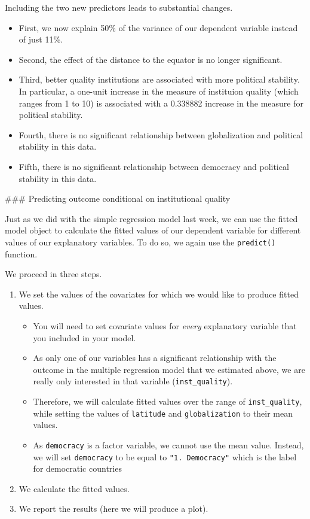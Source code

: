 \documentclass[]{article}
\providecommand{\tightlist}{%
  \setlength{\itemsep}{0pt}\setlength{\parskip}{0pt}}
\begin{document}
Including the two new predictors leads to substantial changes.

\begin{itemize}
\tightlist
\item
  First, we now explain 50\% of the variance of our dependent variable instead of just 11\%.
\item
  Second, the effect of the distance to the equator is no longer significant.
\item
  Third, better quality institutions are associated with more political stability. In particular, a one-unit increase in the measure of instituion quality (which ranges from 1 to 10) is associated with a 0.338882 increase in the measure for political stability.
\item
  Fourth, there is no significant relationship between globalization and political stability in this data.
\item
  Fifth, there is no significant relationship between democracy and political stability in this data.
\end{itemize}

\#\#\# Predicting outcome conditional on institutional quality

Just as we did with the simple regression model last week, we can use the fitted model object to calculate the fitted values of our dependent variable for different values of our explanatory variables. To do so, we again use the \texttt{predict()} function.

We proceed in three steps.

\begin{enumerate}
\def\labelenumi{\arabic{enumi}.}
\tightlist
\item
  We set the values of the covariates for which we would like to produce fitted values.

  \begin{itemize}
  \tightlist
  \item
    You will need to set covariate values for \emph{every} explanatory variable that you included in your model.
  \item
    As only one of our variables has a significant relationship with the outcome in the multiple regression model that we estimated above, we are really only interested in that variable (\texttt{inst\_quality}).
  \item
    Therefore, we will calculate fitted values over the range of \texttt{inst\_quality}, while setting the values of \texttt{latitude} and \texttt{globalization} to their mean values.
  \item
    As \texttt{democracy} is a factor variable, we cannot use the mean value. Instead, we will set \texttt{democracy} to be equal to \texttt{"1.\ Democracy"} which is the label for democratic countries
  \end{itemize}
\item
  We calculate the fitted values.
\item
  We report the results (here we will produce a plot).
\end{enumerate}
\end{document}
